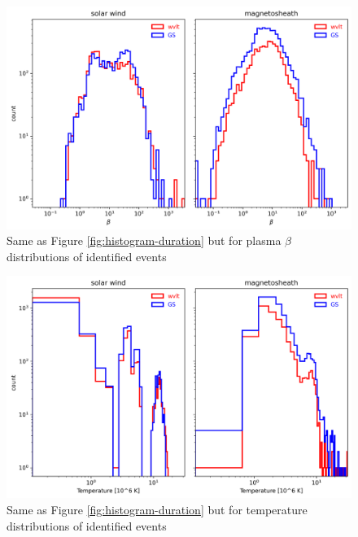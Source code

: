 \begin{figure}
    \centering
    \includegraphics[width=\textwidth]{Figures/Histograms/histogram_logspace_beta.png}
    \caption[Histogram of beta for identified events]{Same as Figure \ref{fig:histogram-duration} but for plasma $\beta$ distributions of identified events}
    \label{fig:histogram-beta}
\end{figure}

\begin{figure}
    \centering
    \includegraphics[width=\textwidth]{Figures/Histograms/histogram_temperature.png}
    \caption[Histogram of temperature for identified events]{Same as Figure \ref{fig:histogram-duration} but for temperature distributions of identified events}
    \label{fig:histogram-temp}
\end{figure}
